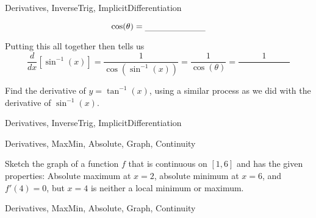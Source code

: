 \begin{tagblock}{Derivatives, InverseTrig, ImplicitDifferentiation}
\begin{question}
\[ \cos (\theta) = \rule[-0.1cm]{2.5cm}{0.01cm}\]
 
 
 \bigskip
 
 Putting this all together then tells us 
 \[ \frac{d}{dx} [\sin^{-1}(x)] = \frac{1}{\cos(\sin^{-1}(x))} = \frac{1}{\cos(\theta)} = \frac{1}{ \hspace{1in}} \]
 
 





\bigskip

Find the derivative of $y= \tan^{-1}(x)$, using a similar process as we did with the derivative of $\sin^{-1}(x)$.  




	
\begin{tags}
	   Derivatives, InverseTrig, ImplicitDifferentiation
\end{tags}
	
\begin{diary}
\end{diary}
	
\begin{solution}
	   
\end{solution}
	
\end{question}

\end{tagblock}



	
\begin{tagblock}{Derivatives, MaxMin, Absolute, Graph, Continuity}
\begin{question}
	


Sketch the graph of a function $f$ that is continuous on $[1, 6]$ and has the given properties:  Absolute maximum at $x=2$, absolute minimum at $x=6$, and $f'(4)=0$, but $x=4$ is neither a local minimum or maximum.



	
\begin{tags}
	   Derivatives, MaxMin, Absolute, Graph, Continuity
\end{tags}
	
\begin{diary}
\end{diary}
	
\begin{solution}
	   
\end{solution}
	
\end{question}

\end{tagblock}

